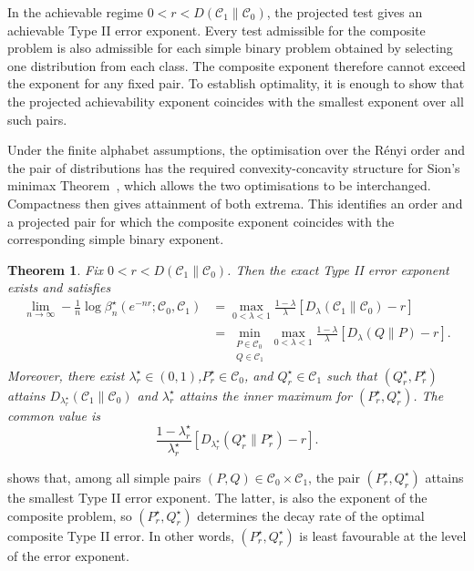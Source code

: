 \documentclass[journal,10pt,draftclsnofoot,onecolumn]{IEEEtran}
\newtheorem{theorem}{Theorem}
\begin{document}
In the achievable regime
$0<r<D(\mathcal C_1\|\mathcal C_0)$, the projected test gives an achievable Type II error exponent. Every test admissible for the composite problem is also admissible for each simple binary problem obtained by selecting one distribution from each class. The composite exponent therefore cannot exceed the exponent for any fixed pair. To establish optimality, it is enough to show that the projected achievability exponent coincides with the smallest exponent over all such
pairs.

Under the finite alphabet assumptions, the optimisation over the
R\'enyi order and the pair of distributions has the required
convexity-concavity structure for Sion's minimax Theorem~\cite[Th.~3.4]{sion1958general}, which allows the two optimisations to be interchanged. Compactness then gives attainment of both extrema. This identifies an order and a projected pair for which the composite exponent coincides with the corresponding simple binary exponent.

\begin{theorem}
\label{thm:exact-composite-exponent}
Fix $0<r<D(\mathcal C_1\|\mathcal C_0)$. Then the exact Type II error
exponent exists and satisfies
\begin{align}
\lim_{n\to\infty}
-\frac{1}{n}\log \beta_n^\star(e^{-nr};\mathcal C_0,\mathcal C_1) & =\max_{0<\lambda<1} \frac{1-\lambda}{\lambda} \left[D_\lambda(\mathcal C_1\|\mathcal C_0)-r \right] \nonumber \\ &= \min_{\substack{P\in\mathcal C_0\\Q\in\mathcal C_1}} \max_{0<\lambda<1}\frac{1-\lambda}{\lambda}\left[D_\lambda(Q\|P)-r\right].
\label{eq:exact-composite-exponent}
\end{align}
Moreover, there exist $\lambda_r^\star\in(0,1)$,$P_r^\star\in\mathcal C_0$, and $Q_r^\star\in\mathcal C_1$ such that $(Q_r^\star,P_r^\star)$ attains $D_{\lambda_r^\star}(\mathcal C_1\|\mathcal C_0)$ and $\lambda_r^\star$ attains the inner maximum for $(P_r^\star,Q_r^\star)$. The common value is
\begin{equation*}
\frac{1-\lambda_r^\star}{\lambda_r^\star}\left[D_{\lambda_r^\star}(Q_r^\star\|P_r^\star)-r\right].
\end{equation*}
\end{theorem}
 shows that, among all simple pairs $(P,Q)\in\mathcal C_0\times\mathcal C_1$, the pair $(P_r^\star,Q_r^\star)$ attains the smallest Type II error exponent. The latter, is also the exponent of the composite problem, so $(P_r^\star,Q_r^\star)$ determines the decay rate of the optimal composite Type II error. In other words, $(P_r^\star,Q_r^\star)$ is least favourable at the level of the error exponent.
\end{document}
